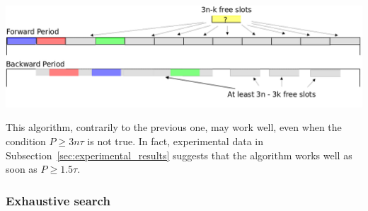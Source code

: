 \documentclass[a4paper,10pt]{article}
\begin{document}
      \begin{center}
      \includegraphics[scale=0.3]{ex3nt.png}
      \end{center}
% 
% 
% 
	
This algorithm, contrarily to the previous one, may work well, even when the condition $P \geq 3n\tau$ is not true.
In fact, experimental data in Subsection~\ref{sec:experimental_results} suggests that the algorithm works well as soon as $P \geq 1.5 \tau$.

	\subsubsection{Exhaustive search}
% 
% 
\end{document}
